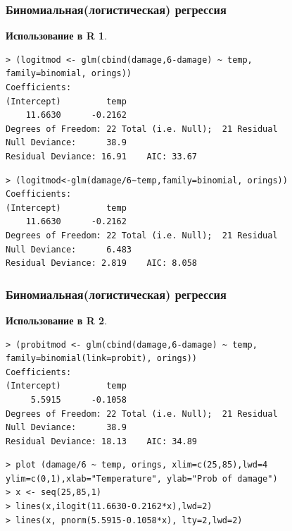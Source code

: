 \documentclass{beamer}
\newtheorem{exmpr}{Использование в R}
\begin{document}
\begin{frame}[containsverbatim]
\frametitle{Биномиальная(логистическая) регрессия}
\begin{exmpr}
\begin{verbatim}
> (logitmod <- glm(cbind(damage,6-damage) ~ temp,
family=binomial, orings))
Coefficients:
(Intercept)         temp  
    11.6630      -0.2162  
Degrees of Freedom: 22 Total (i.e. Null);  21 Residual
Null Deviance:	    38.9 
Residual Deviance: 16.91 	AIC: 33.67
\end{verbatim}
\begin{verbatim}
> (logitmod<-glm(damage/6~temp,family=binomial, orings))
Coefficients:
(Intercept)         temp  
    11.6630      -0.2162  
Degrees of Freedom: 22 Total (i.e. Null);  21 Residual
Null Deviance:	    6.483 
Residual Deviance: 2.819 	AIC: 8.058 
\end{verbatim}
\end{exmpr}
\end{frame}

\begin{frame}[containsverbatim]
\frametitle{Биномиальная(логистическая) регрессия}
\begin{exmpr}
\begin{verbatim}
> (probitmod <- glm(cbind(damage,6-damage) ~ temp,
family=binomial(link=probit), orings))
Coefficients:
(Intercept)         temp  
     5.5915      -0.1058  
Degrees of Freedom: 22 Total (i.e. Null);  21 Residual
Null Deviance:	    38.9
Residual Deviance: 18.13 	AIC: 34.89
\end{verbatim}
\begin{verbatim}
> plot (damage/6 ~ temp, orings, xlim=c(25,85),lwd=4
ylim=c(0,1),xlab="Temperature", ylab="Prob of damage")
> x <- seq(25,85,1)
> lines(x,ilogit(11.6630-0.2162*x),lwd=2)
> lines(x, pnorm(5.5915-0.1058*x), lty=2,lwd=2)
\end{verbatim}
\end{exmpr}
\end{frame}
\end{document}
